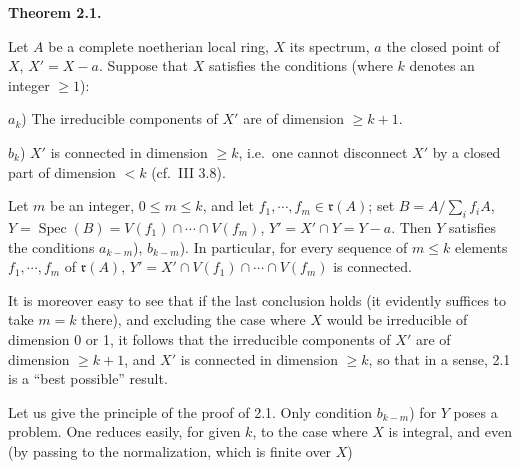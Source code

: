 \documentclass[
  11pt,
  a4paper,
]{book}
\begin{document}
\textbf{Theorem 2.1.}

Let \(A\) be a complete noetherian local ring, \(X\) its spectrum, \(a\)
the closed point of \(X\), \(X' = X - {a}\). Suppose that \(X\)
satisfies the conditions (where \(k\) denotes an integer
\(\geqslant 1\)):

\(a_{k}\)) The irreducible components of \(X'\) are of dimension
\(\geqslant k + 1\).

\(b_{k}\)) \(X'\) is connected in dimension \(\geqslant k\), i.e.~one
cannot disconnect \(X'\) by a closed part of dimension \(<
k\) (cf.~III 3.8).

Let \(m\) be an integer, \(0 \leqslant m \leqslant k\), and let
\(f_{1}, \cdots, f_{m} \in \mathfrak{r}(A)\); set \(B = A /
\sum_{i} f_{i}A\),
\(Y = \operatorname{Spec}(B) = V(f_{1}) \cap \cdots \cap V(f_{m})\),
\(Y' = X' \cap Y = Y - {a}\). Then \(Y\) satisfies the conditions
\(a_{k-m}\)), \(b_{k-m}\)). In particular, for every sequence of
\(m \leqslant k\) elements \(f_{1}, \cdots, f_{m}\) of
\(\mathfrak{r}(A)\), \(Y' = X' \cap V(f_{1}) \cap \cdots \cap V(f_{m})\)
is connected.

It is moreover easy to see that if the last conclusion holds (it
evidently suffices to take \(m = k\) there), and excluding the case
where \(X\) would be irreducible of dimension 0 or 1, it follows that
the irreducible components of \(X'\) are of dimension
\(\geqslant k + 1\), and \(X'\) is connected in dimension
\(\geqslant k\), so that in a sense, 2.1 is a ``best possible'' result.

Let us give the principle of the proof of 2.1. Only condition
\(b_{k-m}\)) for \(Y\) poses a problem. One reduces easily, for given
\(k\), to the case where \(X\) is integral, and even (by passing to the
normalization, which is finite over \(X\))
\end{document}
